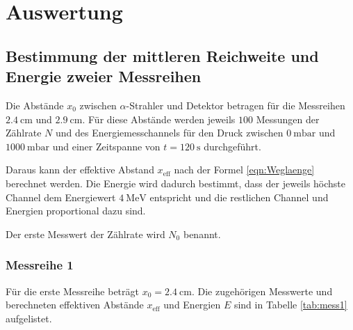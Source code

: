 \section{Auswertung}
\label{sec:Auswertung}

\subsection{Bestimmung der mittleren Reichweite und Energie zweier Messreihen}

Die Abstände $x_0$ zwischen $\alpha$-Strahler und Detektor betragen für die Messreihen
$\SI{2.4}{\centi\meter}$ und $\SI{2.9}{\centi\meter}$. Für diese Abstände werden jeweils
$100$ Messungen der Zählrate $N$ und des Energiemesschannels für den Druck zwischen
$\SI{0}{\milli\bar}$ und $\SI{1000}{\milli\bar}$ und einer Zeitspanne von
$t = \SI{120}{\second}$ durchgeführt. 

Daraus kann der effektive Abstand $x_\text{eff}$ nach der Formel \eqref{eqn:Weglaenge}
berechnet werden. Die Energie wird dadurch bestimmt, dass der jeweils höchste Channel dem
Energiewert $\SI{4}{\mega\eV}$ entspricht und die restlichen Channel und Energien
proportional dazu sind.

Der erste Messwert der Zählrate wird $N_0$ benannt.

\subsubsection{Messreihe 1} %

Für die erste Messreihe beträgt $x_0 = \SI{2.4}{\centi\meter}$. Die zugehörigen
Messwerte und berechneten effektiven Abstände $x_\text{eff}$ und Energien $E$ sind in
Tabelle \ref{tab:mess1} aufgelistet.

